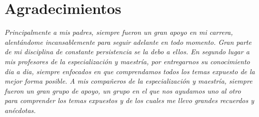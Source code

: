 \chapter*{Agradecimientos}

\hfill \textit{Principalmente a mis padres, siempre fueron un gran apoyo en mi carrera, alentándome incansablemente 
para seguir adelante en todo momento. Gran parte de mi disciplina de constante persistencia se la debo a ellos. 
En segundo lugar a mis profesores de la especialización y maestría, por entregarnos su conocimiento dia a dia, 
siempre enfocados en que comprendamos todos los temas expuesto de la mejor forma posible. A mis compañeros 
de la especialización y maestría, siempre fueron un gran grupo de apoyo, un grupo en el que nos 
ayudamos uno al otro para comprender los temas expuestos y de los cuales me llevo grandes recuerdos y anécdotas.}
